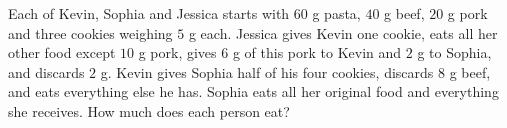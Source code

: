 Each of Kevin, Sophia and Jessica starts with $ 60 $ g pasta, $ 40 $ g beef, $ 20 $ g pork and three cookies weighing $ 5 $ g each. Jessica gives Kevin one cookie, eats all her other food except $ 10 $ g pork, gives $ 6 $ g of this pork to Kevin and $ 2 $ g to Sophia, and discards $ 2 $ g. Kevin gives Sophia half of his four cookies, discards $ 8 $ g beef, and eats everything else he has. Sophia eats all her original food and everything she receives. How much does each person eat?

